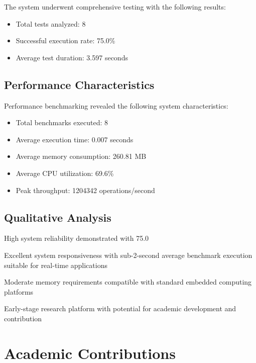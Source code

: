\documentclass[12pt]{article}
\begin{document}
The system underwent comprehensive testing with the following results:
\begin{itemize}
    \item Total tests analyzed: 8
    \item Successful execution rate: 75.0\%
    \item Average test duration: 3.597 seconds
\end{itemize}


\subsection{Performance Characteristics}

Performance benchmarking revealed the following system characteristics:
\begin{itemize}
    \item Total benchmarks executed: 8
    \item Average execution time: 0.007 seconds
    \item Average memory consumption: 260.81 MB
    \item Average CPU utilization: 69.6\%
    \item Peak throughput: 1204342 operations/second
\end{itemize}


\subsection{Qualitative Analysis}

\item High system reliability demonstrated with 75.0%
\item Excellent system responsiveness with sub-2-second average benchmark execution suitable for real-time applications
\item Moderate memory requirements compatible with standard embedded computing platforms
\item Early-stage research platform with potential for academic development and contribution

\section{Academic Contributions}
\end{document}
